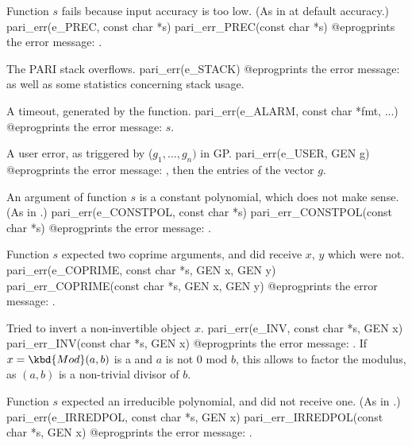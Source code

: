  Function $s$ fails because input accuracy is too low.
(As in  at default accuracy.)
\bprog
  pari_err(e_PREC, const char *s)
  pari_err_PREC(const char *s)
@eprog\noindent prints the error message: .

 The PARI stack overflows.
\bprog
  pari_err(e_STACK)
@eprog\noindent prints the error message: 
as well as some statistics concerning stack usage.


 A timeout, generated by the  function.
\bprog
  pari_err(e_ALARM, const char *fmt, ...)
@eprog\noindent prints the error message: $s$.

 A user error, as triggered by ($g_1,\dots,g_n)$
in GP.
\bprog
  pari_err(e_USER, GEN g)
@eprog\noindent prints the error message: , then the
entries of the vector $g$.


 An argument of function $s$ is a constant polynomial,
which does not make sense. (As in .)
\bprog
  pari_err(e_CONSTPOL, const char *s)
  pari_err_CONSTPOL(const char *s)
@eprog\noindent prints the error message: .

 Function $s$ expected two coprime arguments, and did
receive $x$, $y$ which were not.
\bprog
  pari_err(e_COPRIME, const char *s, GEN x, GEN y)
  pari_err_COPRIME(const char *s, GEN x, GEN y)
@eprog\noindent prints the error message: .

 Tried to invert a non-invertible object $x$.
\bprog
  pari_err(e_INV, const char *s, GEN x)
  pari_err_INV(const char *s, GEN x)
@eprog\noindent prints the error message: .
If $x = \kbd{Mod}(a,b)$ is a  and $a$ is not $0$ mod $b$, this
allows to factor the modulus, as $(a,b)$ is a non-trivial divisor of
$b$.

 Function $s$ expected an irreducible polynomial,
and did not receive one. (As in .)
\bprog
  pari_err(e_IRREDPOL, const char *s, GEN x)
  pari_err_IRREDPOL(const char *s, GEN x)
@eprog\noindent prints the error message: .

